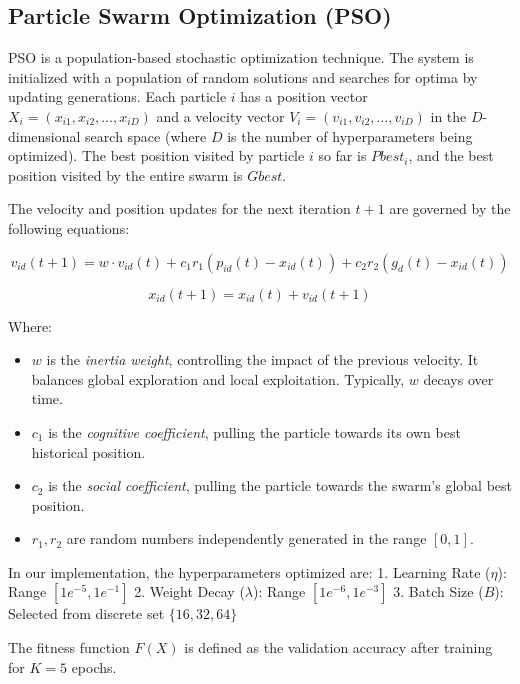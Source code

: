 \documentclass[journal]{IEEEtran}
\begin{document}
\subsection{Particle Swarm Optimization (PSO)}
PSO is a population-based stochastic optimization technique. The system is initialized with a population of random solutions and searches for optima by updating generations.
Each particle $i$ has a position vector $X_i = (x_{i1}, x_{i2}, \dots, x_{iD})$ and a velocity vector $V_i = (v_{i1}, v_{i2}, \dots, v_{iD})$ in the $D$-dimensional search space (where $D$ is the number of hyperparameters being optimized).
The best position visited by particle $i$ so far is $Pbest_i$, and the best position visited by the entire swarm is $Gbest$.

The velocity and position updates for the next iteration $t+1$ are governed by the following equations:

\begin{equation}
v_{id}(t+1) = w \cdot v_{id}(t) + c_1 r_1 (p_{id}(t) - x_{id}(t)) + c_2 r_2 (g_{d}(t) - x_{id}(t))
\end{equation}

\begin{equation}
x_{id}(t+1) = x_{id}(t) + v_{id}(t+1)
\end{equation}

Where:
\begin{itemize}
    \item $w$ is the \textit{inertia weight}, controlling the impact of the previous velocity. It balances global exploration and local exploitation. Typically, $w$ decays over time.
    \item $c_1$ is the \textit{cognitive coefficient}, pulling the particle towards its own best historical position.
    \item $c_2$ is the \textit{social coefficient}, pulling the particle towards the swarm's global best position.
    \item $r_1, r_2$ are random numbers independently generated in the range $[0, 1]$.
\end{itemize}

In our implementation, the hyperparameters optimized are:
1. Learning Rate ($\eta$): Range $[1e^{-5}, 1e^{-1}]$
2. Weight Decay ($\lambda$): Range $[1e^{-6}, 1e^{-3}]$
3. Batch Size ($B$): Selected from discrete set $\{16, 32, 64\}$

The fitness function $F(X)$ is defined as the validation accuracy after training for $K=5$ epochs.
\end{document}
